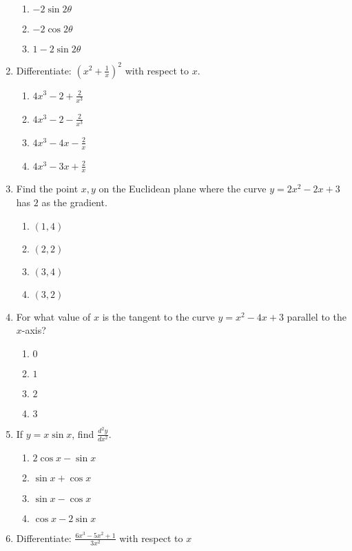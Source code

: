 \begin{multicols}{2}
\begin{enumerate}[label={\arabic*.}]
\begin{enumerate}[label={\Alph*.}]
            \item  \(-2\sin 2\theta\)
            \item  \(-2\cos 2\theta\)
            \item  \(1-2\sin 2\theta\)
        \end{enumerate}
  \item Differentiate: \(\left(x^2 + \frac{1}{x}\right)^2\) with respect to \(x\).
       \begin{enumerate}[label={\Alph*.}]
            \item \(4x^3 - 2 + \frac{2}{x^3}\)
            \item  \(4x^3 - 2 - \frac{2}{x^3}\)
            \item   \(4x^3 - 4x - \frac{2}{x}\)
            \item    \(4x^3 - 3x + \frac{2}{x}\)
        \end{enumerate}
\item Find the point \(x,y\) on the Euclidean plane where the curve \(y = 2x^{2} - 2x +3\) has \(2\) as the gradient.
    \begin{enumerate}[label={\Alph*.}]
        \item \((1, 4)\)
        \item \((2, 2)\)
        \item \((3, 4)\)
        \item \((3, 2)\)
    \end{enumerate}  
\item For what value of \(x\) is the tangent to the curve \(y = x^{2} - 4x + 3\) parallel to the \(x\)-axis?
    \begin{enumerate}[label={\Alph*.}]
        \item \(0\)
        \item \(1\)
        \item \(2\)
        \item \(3\)
    \end{enumerate}   
\item If \(y = x \sin x\), find \( \frac{d^2y}{dx^2} \).
	\begin{enumerate}[label={\Alph*.}]
	\item \(2\cos x - \sin x\)
	\item \(\sin x + \cos x\)
	\item \(\sin x  - \cos  x\)
	\item \( \cos x  - 2\sin x \)
	\end{enumerate}
\item Differentiate: \(\frac{6x^{3} - 5x^{2} + 1}{3x^{2}}\) with respect to \(x\)

\end{enumerate}
\end{multicols}
